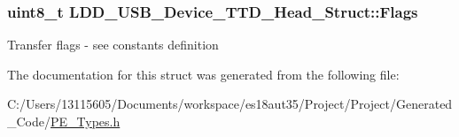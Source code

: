 \subsubsection[{Flags}]{\setlength{\rightskip}{0pt plus 5cm}uint8\+\_\+t L\+D\+D\+\_\+\+U\+S\+B\+\_\+\+Device\+\_\+\+T\+T\+D\+\_\+\+Head\+\_\+\+Struct\+::\+Flags}\label{struct_l_d_d___u_s_b___device___t_t_d___head___struct_a9572bb866ff1f22ed881f3ff618c0445}
Transfer flags -\/ see constants definition 

The documentation for this struct was generated from the following file\+:\begin{DoxyCompactItemize}
\item 
C\+:/\+Users/13115605/\+Documents/workspace/es18aut35/\+Project/\+Project/\+Generated\+\_\+\+Code/\hyperlink{_p_e___types_8h}{P\+E\+\_\+\+Types.\+h}\end{DoxyCompactItemize}
